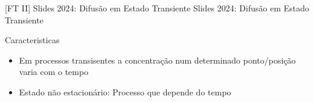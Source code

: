 \documentclass[\mainfilename]{subfiles}
\begin{document}
\graphicspath{{\subfix{./figures/FT_II-Slides_Annotations.2024.1.7}}}

[FT II]
{Slides 2024: Difusão em Estado Transiente} %
{Slides 2024: Difusão em Estado Transiente} %

\begin{sectionBox}{Caracteristicas} %
    
    \begin{itemize}
        \item Em processos transisentes a concentração num determinado ponto/posição varia com o tempo
        \item Estado não estacionário: Processo que depende do tempo
    \end{itemize}
    
\end{sectionBox}
\end{document}
